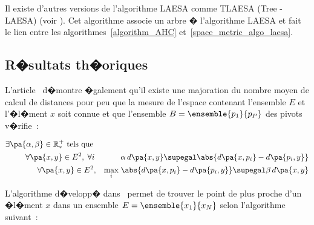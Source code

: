 
Il existe d'autres versions de l'algorithme LAESA comme TLAESA (Tree - LAESA) (voir ). Cet algorithme associe un arbre � l'algorithme LAESA et fait le lien entre les algorithmes~\ref{algorithm_AHC} et~\ref{space_metric_algo_laesa}.




\subsection{R�sultats th�oriques}

L'article~ d�montre �galement qu'il existe une majoration du nombre moyen de calcul de distances pour peu que la mesure de l'espace contenant l'ensemble $E$ et l'�l�ment $x$ soit connue et que l'ensemble $B = \ensemble{p_1}{p_P}$ des pivots v�rifie~:

            \begin{eqnarray}
            \exists \pa{\alpha,\beta} \in \mathbb{R}^+_* \text{ tels que } && \nonumber\\
            \forall \pa{x,y} \in E^2, \; \forall i\, && \alpha \, d\pa{x,y} \supegal 
                            \abs{d\pa{x,p_i} - d\pa{p_i,y}} \label{space_metric_cond_1} \\
            \forall \pa{x,y} \in E^2, && \underset{i}{\max} \; \abs{d\pa{x,p_i} - d\pa{p_i,y}} \supegal 
                            \beta \, d\pa{x,y} \label{space_metric_cond_1}
            \end{eqnarray}


L'algorithme d�velopp� dans~ permet de trouver le point de plus proche d'un �l�ment $x$ dans un ensemble $E = \ensemble{x_1}{x_N}$ selon l'algorithme suivant~:


